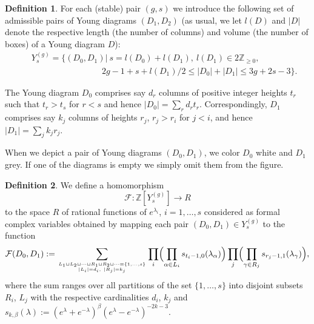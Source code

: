 \documentclass[11pt]{article}
\def\bea{\begin{eqnarray}}
\def\eea{\end{eqnarray}}
\def\bea{\begin{eqnarray}}
\def\eea{\end{eqnarray}}
\def\beq{\begin{equation}}
\def\eeq{\end{equation}}
\theoremstyle{plain}
\theoremstyle{definition}
\newtheorem{definition}{Definition}
\def\beq{\begin{equation}}
\def\eeq{\end{equation}}
\def\bea{\begin{eqnarray}}
\def\eea{\end{eqnarray}}
\begin{document}
\begin{definition}
For each (stable) pair $(g,s)$ we introduce the following set of admissible pairs of Young diagrams $(D_1,D_2)$ (as usual, we let
$l(D)$ and $|D|$ denote the respective length (the number of columns) and volume (the number of boxes) of a Young diagram $D$):
\bea
&{}&Y^{(g)}_s=\{(D_0,D_1)| \ s=l(D_0)+l(D_1),\ l(D_1)\in 2{\mathbb Z}_{\ge0},\nonumber\\
&{}&\phantom{yuyjjuoioioyuyuyu}2g-1+s+l(D_1)/2\le |D_0|+|D_1|\le 3g+2s-3\}.
\label{You1}
\eea


The Young diagram $D_0$ comprises say $d_r$ columns of positive integer heights $t_r$ such that $t_r>t_s$ for $r<s$ and hence $|D_0|=\sum_r d_rt_r$.
Correspondingly, $D_1$ comprises say $k_j$ columns
of heights $r_j$, $r_j>r_i$ for $j<i$, and hence $|D_1|=\sum_j k_jr_j$. 
\end{definition}

When we depict a pair of Young diagrams $(D_0,D_1)$, we color $D_0$ white and $D_1$ grey. If one of the diagrams is empty we simply omit them from the figure.

\begin{definition}\label{def-hom}
We define a homomorphism 
$$ 
{\mathcal F} : \mathbb Z[Y^{(g)}_{s} ] \rightarrow R
$$ 
to the space $R$ of rational functions of $e^{\lambda_i}$, $i=1,\dots,s$ considered as formal complex variables
obtained by mapping each pair $(D_0,D_1)\in Y^{(g)}_{s} $ to the function 
\beq
{\mathcal F}(D_0,D_1):=\sum_{{L_1\sqcup L_2\sqcup\cdots \sqcup R_1\sqcup R_2
\sqcup\cdots=\{1,\dots,s\}\atop |L_i|=d_i,\ |R_j|=k_j}}\prod_{i} \Bigl( \prod_{\alpha\in L_i}
s_{t_{i}-1,0}(\lambda_\alpha)\Bigr) \prod_{j} \Bigl( \prod_{\gamma\in R_j} s_{r_j-1,1}(\lambda_\gamma)\Bigr),\label{hom-F}
\eeq
where the sum ranges over all partitions of the set $\{1,\dots,s\}$ into disjoint subsets $R_i$, $L_j$ with the respective cardinalities 
$d_i$, $k_j$
and $s_{k,\beta}(\lambda):=(e^\lambda+e^{-\lambda})^\beta(e^\lambda-e^{-\lambda})^{-2k-3}$.
\end{definition}
\end{document}
